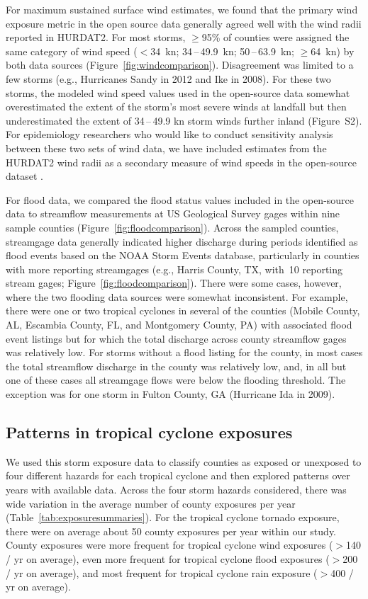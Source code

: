 For maximum sustained surface wind estimates, we found that the primary wind
exposure metric in the open source data generally agreed well with the wind
radii reported in \ac{HURDAT2}. For most storms, $\ge$95\% of counties were
assigned the same category of wind speed ($<$34~\si{\knot};
34\,--\,49.9~\si{\knot}; 50\,--\,63.9~\si{\knot}; $\ge$64~\si{\knot}) by both
data sources (Figure~\ref{fig:windcomparison}).  Disagreement was limited to a
few storms (e.g., Hurricanes Sandy in 2012 and Ike in 2008). For these two
storms, the modeled wind speed values used in the open-source data somewhat
overestimated the extent of the storm's most severe winds at landfall but then
underestimated the extent of 34\,--\,49.9 \si{\knot} storm winds further inland
(Figure~S2). For epidemiology researchers who would like to conduct sensitivity
analysis between these two sets of wind data, we have included estimates from
the \ac{HURDAT2} wind radii as a secondary measure of wind speeds in the
open-source dataset \parencite{hurricaneexposuredata}.

For flood data, we compared the flood status values included in the open-source
data to streamflow measurements at \ac{US} Geological Survey gages within nine
sample counties (Figure~\ref{fig:floodcomparison}). Across the sampled
counties, streamgage data generally indicated higher discharge during periods
identified as flood events based on the NOAA Storm Events database,
particularly in counties with more reporting streamgages (e.g., Harris County,
TX, with~10 reporting stream gages; Figure~\ref{fig:floodcomparison}). There
were some cases, however, where the two flooding data sources were somewhat
inconsistent.  For example, there were one or two tropical cyclones in several
of the counties (Mobile County, AL, Escambia County, FL, and Montgomery County,
PA) with associated flood event listings but for which the total discharge
across county streamflow gages was relatively low. For storms without a flood
listing for the county, in most cases the total streamflow discharge in the
county was relatively low, and, in all but one of these cases all streamgage
flows were below the flooding threshold. The exception was for one storm in
Fulton County, GA (Hurricane Ida in 2009). 

\subsection*{Patterns in tropical cyclone exposures}

We used this storm exposure data to classify counties as exposed or unexposed
to four different hazards for each tropical cyclone and then explored patterns
over years with available data. Across the four storm hazards considered, there
was wide variation in the average number of county exposures per year
(Table~\ref{tab:exposuresummaries}). For the tropical cyclone tornado exposure,
there were on average about 50 county exposures per year within our study.
County exposures were more frequent for tropical cyclone wind exposures ($>$140
/ yr on average), even more frequent for tropical cyclone flood exposures
($>$200 / yr on average), and most frequent for tropical cyclone rain exposure
($>$400 / yr on average). 

